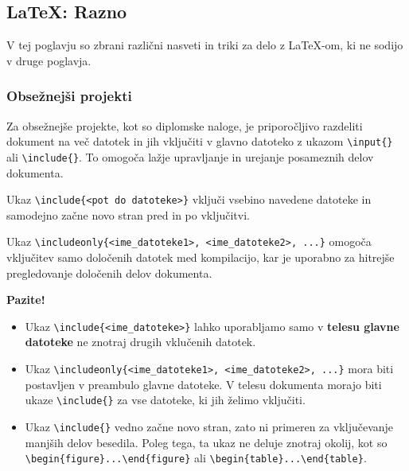 \subsection{LaTeX: Razno}

V tej poglavju so zbrani različni nasveti in triki za delo z LaTeX-om, ki ne sodijo v druge poglavja.

\subsubsection{Obsežnejši projekti}

Za obsežnejše projekte, kot so diplomske naloge, je priporočljivo razdeliti dokument na več datotek in jih vključiti v glavno datoteko z ukazom \texttt{{\textbackslash}input\{\}} ali \texttt{{\textbackslash}include\{\}}.
To omogoča lažje upravljanje in urejanje posameznih delov dokumenta.

Ukaz \texttt{{\textbackslash}include\{\textless pot do datoteke\textgreater \}} vključi vsebino navedene datoteke in samodejno začne novo stran pred in po vključitvi.

Ukaz \texttt{{\textbackslash}includeonly\{\textless ime\_datoteke1\textgreater , \textless ime\_datoteke2\textgreater , ...\}} omogoča vključitev samo določenih datotek med kompilacijo, kar je uporabno za hitrejše pregledovanje določenih delov dokumenta.

\begin{framed}
\textbf{Pazite!}\\
\begin{itemize}
\item Ukaz \texttt{{\textbackslash}include\{\textless ime\_datoteke\textgreater \}} lahko uporabljamo samo v \textbf{telesu glavne datoteke} ne znotraj drugih vklučenih datotek.
\item Ukaz \texttt{{\textbackslash}includeonly\{\textless ime\_datoteke1\textgreater , \textless ime\_datoteke2\textgreater , ...\}} mora biti postavljen v preambulo glavne datoteke.
V telesu dokumenta morajo biti
ukaze \texttt{{\textbackslash}include\{\}} za vse datoteke, ki jih želimo vključiti.
\item Ukaz \texttt{{\textbackslash}include\{\}} vedno začne novo stran, zato ni primeren za vključevanje manjših delov besedila. Poleg tega, ta ukaz ne deluje znotraj okolij, kot so \texttt{{\textbackslash}begin\{figure\}...{\textbackslash}end\{figure\}} ali \texttt{{\textbackslash}begin\{table\}...{\textbackslash}end\{table\}}.
\end{itemize}
\end{framed}

